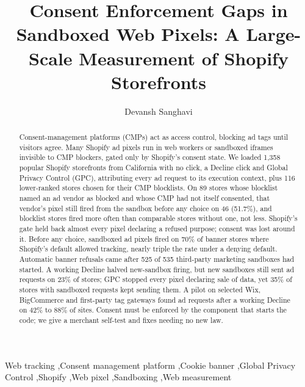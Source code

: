 \begin{frontmatter}

\title{Consent Enforcement Gaps in Sandboxed Web Pixels: A Large-Scale Measurement of Shopify Storefronts}

\author{Devansh Sanghavi}


\begin{abstract}
Consent-management platforms (CMPs) act as access control, blocking ad tags until visitors agree. Many Shopify ad pixels run in web workers or sandboxed iframes invisible to CMP blockers, gated only by Shopify's consent state. We loaded 1,358 popular Shopify storefronts from California with no click, a Decline click and Global Privacy Control (GPC), attributing every ad request to its execution context, plus 116 lower-ranked stores chosen for their CMP blocklists. On 89 stores whose blocklist named an ad vendor as blocked and whose CMP had not itself consented, that vendor's pixel still fired from the sandbox before any choice on 46 (51.7\%), and blocklist stores fired more often than comparable stores without one, not less. Shopify's gate held back almost every pixel declaring a refused purpose; consent was lost around it. Before any choice, sandboxed ad pixels fired on 70\% of banner stores where Shopify's default allowed tracking, nearly triple the rate under a denying default. Automatic banner refusals came after 525 of 535 third-party marketing sandboxes had started. A working Decline halved new-sandbox firing, but new sandboxes still sent ad requests on 23\% of stores; GPC stopped every pixel declaring sale of data, yet 35\% of stores with sandboxed requests kept sending them. A pilot on selected Wix, BigCommerce and first-party tag gateways found ad requests after a working Decline on 42\% to 88\% of sites. Consent must be enforced by the component that starts the code; we give a merchant self-test and fixes needing no new law.
\end{abstract}

\begin{keyword}
Web tracking \sep Consent management platform \sep Cookie banner \sep Global Privacy Control \sep Shopify \sep Web pixel \sep Sandboxing \sep Web measurement
\end{keyword}

\end{frontmatter}
